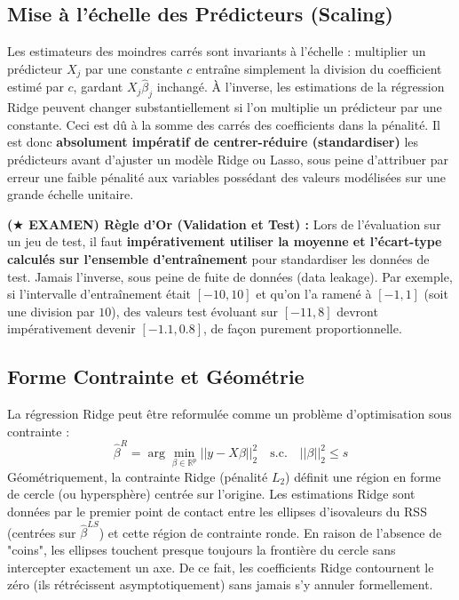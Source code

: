 \subsection{Mise à l'échelle des Prédicteurs (Scaling)}

Les estimateurs des moindres carrés sont invariants à l'échelle : multiplier un prédicteur $X_j$ par une constante $c$ entraîne simplement la division du coefficient estimé par $c$, gardant $X_j \hat{\beta}_j$ inchangé. 
À l'inverse, les estimations de la régression Ridge peuvent changer substantiellement si l'on multiplie un prédicteur par une constante. 
Ceci est dû à la somme des carrés des coefficients dans la pénalité. 
Il est donc \textbf{absolument impératif de centrer-réduire (standardiser)} les prédicteurs avant d'ajuster un modèle Ridge ou Lasso, sous peine d'attribuer par erreur une faible pénalité aux variables possédant des valeurs modélisées sur une grande échelle unitaire.

\textbf{($\bigstar$ EXAMEN) Règle d'Or (Validation et Test) :} Lors de l'évaluation sur un jeu de test, il faut \textbf{impérativement utiliser la moyenne et l'écart-type calculés sur l'ensemble d'entraînement} pour standardiser les données de test. Jamais l'inverse, sous peine de fuite de données (data leakage). Par exemple, si l'intervalle d'entraînement était $[-10, 10]$ et qu'on l'a ramené à $[-1, 1]$ (soit une division par $10$), des valeurs test évoluant sur $[-11, 8]$ devront impérativement devenir $[-1.1, 0.8]$, de façon purement proportionnelle.

\subsection{Forme Contrainte et Géométrie}

La régression Ridge peut être reformulée comme un problème d'optimisation sous contrainte :
$$\hat{\beta}^R = \arg\min_{\beta \in \mathbb{R}^p} ||y - X\beta||_2^2 \quad \text{s.c.} \quad ||\beta||_2^2 \le s$$ 
Géométriquement, la contrainte Ridge (pénalité $L_2$) définit une région en forme de cercle (ou hypersphère) centrée sur l'origine. 
Les estimations Ridge sont données par le premier point de contact entre les ellipses d'isovaleurs du RSS (centrées sur $\hat{\beta}^{LS}$) et cette région de contrainte ronde. En raison de l'absence de "coins", les ellipses touchent presque toujours la frontière du cercle sans intercepter exactement un axe. De ce fait, les coefficients Ridge contournent le zéro (ils rétrécissent asymptotiquement) sans jamais s'y annuler formellement.

